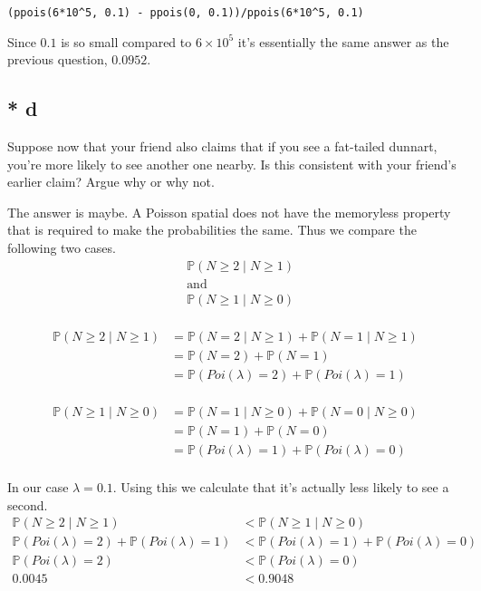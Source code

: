 \documentclass{article}
\newcommand{\prob}{\mathbb{P}}
\begin{document}
\begin{verbatim}
(ppois(6*10^5, 0.1) - ppois(0, 0.1))/ppois(6*10^5, 0.1)
\end{verbatim}

Since $0.1$ is so small compared to $6 \times 10^5$ it's essentially the same
answer as the previous question, $0.0952$.

\subsection{* d}
Suppose now that your friend also claims that if you see a fat-tailed dunnart,
you're more likely to see another one nearby. Is this consistent with your
friend's earlier claim? Argue why or why not.

The answer is maybe.
A Poisson spatial does not have the memoryless property that
is required to make the probabilities the same. Thus we compare the following
two cases.
\begin{align*}
    &\prob(N \geq 2 \;|\; N \geq 1) \\
    &\text{and} \\
    &\prob(N \geq 1 \;|\; N \geq 0) \\
\end{align*}

\begin{align*}
    \prob(N \geq 2 \;|\; N \geq 1)
    &= \prob(N = 2 \;|\; N \geq 1) + \prob(N = 1 \;|\; N \geq 1) \\
    &= \prob(N = 2) + \prob(N = 1) \\
    &= \prob(Poi(\lambda) = 2) + \prob(Poi(\lambda) = 1) \\
\end{align*}

\begin{align*}
    \prob(N \geq 1 \;|\; N \geq 0)
    &= \prob(N = 1 \;|\; N \geq 0) + \prob(N = 0 \;|\; N \geq 0) \\
    &= \prob(N = 1) + \prob(N = 0) \\
    &= \prob(Poi(\lambda) = 1) + \prob(Poi(\lambda) = 0) \\
\end{align*}

In our case $\lambda = 0.1$. Using this we calculate that it's actually less
likely to see a second.
\begin{align*}
    \prob(N \geq 2 \;|\; N \geq 1) &< \prob(N \geq 1 \;|\; N \geq 0) \\
    \prob(Poi(\lambda) = 2) + \prob(Poi(\lambda) = 1)
    &< \prob(Poi(\lambda) = 1) + \prob(Poi(\lambda) = 0) \\
    \prob(Poi(\lambda) = 2) &< \prob(Poi(\lambda) = 0) \\
    0.0045 &< 0.9048 \\
\end{align*}
\end{document}

